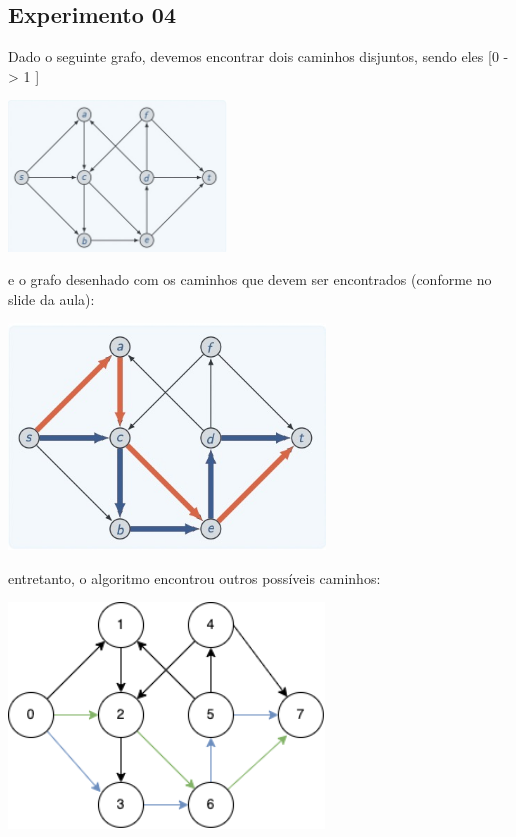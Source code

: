 \subsection{Experimento 04}

Dado o seguinte grafo, devemos encontrar dois caminhos disjuntos, sendo eles 
[0 -> 1 ]

\begin{center}
\includegraphics[height=4cm]{figuras/04.jpg}
\end{center}

e o grafo desenhado com os caminhos que devem ser encontrados (conforme no slide da aula):

\begin{center}
\includegraphics[height=6cm]{figuras/04_caminhos.jpg}
\end{center}

entretanto, o algoritmo encontrou outros possíveis caminhos:

\begin{center}
\includegraphics[height=6cm]{figuras/04_caminhos2.png}
\end{center}



